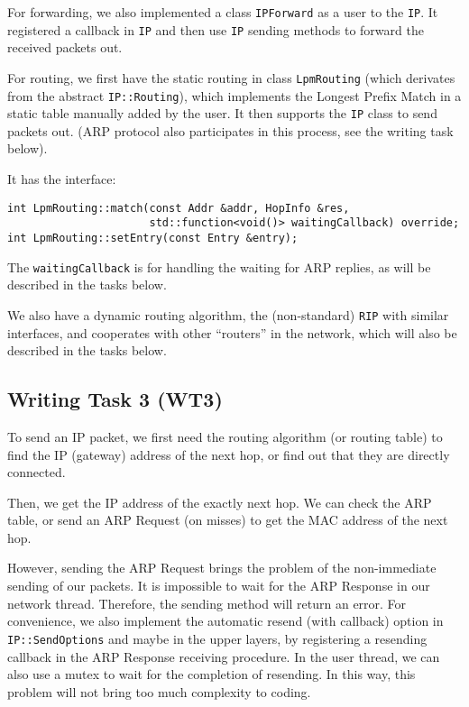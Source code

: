 \documentclass[a4paper]{article}
\begin{document}
  For forwarding, we also implemented a class \texttt{IPForward} as a user to the \texttt{IP}.
  It registered a callback in \texttt{IP} and then use \texttt{IP} sending methods to forward the received packets out.

  For routing, we first have the static routing in class \texttt{LpmRouting} (which derivates from the abstract \texttt{IP::Routing}), which implements the Longest Prefix Match in a static table manually added by the user.
  It then supports the \texttt{IP} class to send packets out. (ARP protocol also participates in this process, see the writing task below).

  It has the interface:
  \begin{verbatim}
int LpmRouting::match(const Addr &addr, HopInfo &res,
                      std::function<void()> waitingCallback) override;
int LpmRouting::setEntry(const Entry &entry);
  \end{verbatim}
  The \texttt{waitingCallback} is for handling the waiting for ARP replies, as will be described in the tasks below.

  We also have a dynamic routing algorithm, the (non-standard) \texttt{RIP} with similar interfaces, and cooperates with other ``routers'' in the network, which will also be described in the tasks below.

  \subsection{Writing Task 3 (WT3)}

  To send an IP packet, we first need the routing algorithm (or routing table) to find the IP (gateway) address of the next hop, or find out that they are directly connected.

  Then, we get the IP address of the exactly next hop.
  We can check the ARP table, or send an ARP Request (on misses) to get the MAC address of the next hop.

  However, sending the ARP Request brings the problem of the non-immediate sending of our packets.
  It is impossible to wait for the ARP Response in our network thread.
  Therefore, the sending method will return an error.
  For convenience, we also implement the automatic resend (with callback) option in \texttt{IP::SendOptions} and maybe in the upper layers, by registering a resending callback in the ARP Response receiving procedure.
  In the user thread, we can also use a mutex to wait for the completion of resending.
  In this way, this problem will not bring too much complexity to coding.
\end{document}
